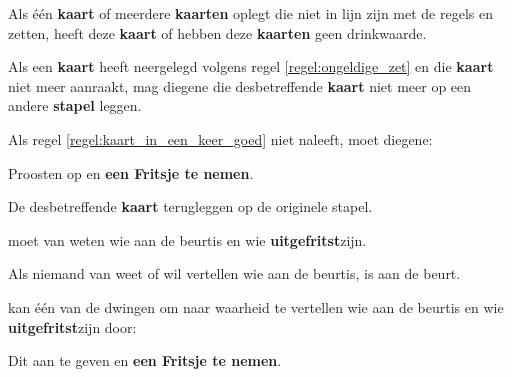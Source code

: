 \vervolgLijst{}
\item Als \eenSpeler één \textbf{kaart} of meerdere \textbf{kaarten} oplegt die niet in lijn zijn met de regels en zetten, heeft deze \textbf{kaart} of hebben deze \textbf{kaarten} geen drinkwaarde.
\eindLijst{}


\vervolgLijst{}
\item Als \eenSpeler een \textbf{kaart} heeft neergelegd volgens regel \ref{regel:ongeldige_zet} en die \textbf{kaart} niet meer aanraakt, mag diegene die desbetreffende \textbf{kaart} niet meer op een andere \textbf{stapel} leggen.
\label{regel:kaart_in_een_keer_goed}
\eindLijst{}

\vervolgLijst{}
\item Als \eenSpeler regel \ref{regel:kaart_in_een_keer_goed} niet naleeft, moet diegene:
\puntLijst{}
\item Proosten op  en \textbf{een Fritsje te nemen}\footnotemark[3].
\item De desbetreffende \textbf{kaart} terugleggen op de originele stapel.
\eindPuntLijst{}
\eindLijst{}


\vervolgLijst{}
\item \EenSpeler moet van \alleSpelers weten wie aan de beurt\footnotemark[1] is en wie \textbf{uitgefritst}\footnotemark[4] zijn.
\eindLijst{}

\vervolgLijst{}
\item Als niemand van \alleSpelers weet of wil vertellen wie aan de beurt\footnotemark[1] is, is \Frits aan de beurt\footnotemark[1].
\eindLijst{}

\vervolgLijst{}
\item \EenSpeler kan \'e\'en van de \medeSpelers dwingen om naar waarheid te vertellen wie aan de beurt\footnotemark[4] is en wie \textbf{uitgefritst}\footnotemark[4] zijn door:
\puntLijst{}
\item Dit aan te geven en \textbf{een Fritsje te nemen}\footnotemark[3].
\eindPuntLijst{}
\eindLijst{}


